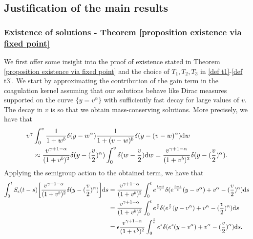 \documentclass[11pt]{article}
\numberwithin{equation}{section}
\newcommand{\der}{\textup{d}}
\begin{document}

\subsection{Justification of the main results}\label{proof of existence heuristics}
\subsubsection*{Existence of solutions - Theorem \ref{proposition existence via fixed point}}
We first offer some insight into the proof of existence stated in Theorem \ref{proposition existence via fixed point} and the choice of $T_{1},T_{2}, T_{3}$ in \eqref{def t1}-\eqref{def t3}. We start by approximating the contribution of the gain term in the coagulation kernel assuming that our solutions behave like Dirac measures supported on the curve $\{y=v^{\alpha}\}$ with sufficiently fast decay for large values of $v$. The decay in $v$ is so that we obtain mass-conserving solutions. More precisely, we have that
\begin{align*}
    v^{\gamma}&\int_{0}^{v}\frac{1}{1+w^{b}}\delta(y-w^{\alpha})\frac{1}{1+(v-w)^{b}}\delta(y-(v-w)^{\alpha})\der w\\
    &\approx \frac{v^{\gamma+1-\alpha}}{(1+v^{b})^{2}}\delta(y-(\frac{v}{2})^{\alpha})\int_{0}^{v}\delta(w-\frac{v}{2})\der w=\frac{v^{\gamma+1-\alpha}}{(1+v^{b})^{2}}\delta(y-(\frac{v}{2})^{\alpha}).
\end{align*}
Applying the semigroup action to the obtained term, we have that
\begin{align*}
    \int_{0}^{t}S_{\epsilon}(t-s)\bigg[\frac{v^{\gamma+1-\alpha}}{(1+v^{b})^{2}}\delta(y-(\frac{v}{2})^{\alpha})\bigg]\der s&= \frac{v^{\gamma+1-\alpha}}{(1+v^{b})^{2}}\int_{0}^{t}e^{\frac{t-s}{\epsilon}}\delta(e^{\frac{t-s}{\epsilon}}(y-v^{\alpha})+v^{\alpha}-(\frac{v}{2})^{\alpha})\der s\\
    &= \frac{v^{\gamma+1-\alpha}}{(1+v^{b})^{2}}\int_{0}^{t}e^{\frac{s}{\epsilon}}\delta(e^{\frac{s}{\epsilon}}(y-v^{\alpha})+v^{\alpha}-(\frac{v}{2})^{\alpha})\der s\\
       &= \epsilon \frac{v^{\gamma+1-\alpha}}{(1+v^{b})^{2}}\int_{0}^{\frac{t}{\epsilon}}e^{s}\delta(e^{s}(y-v^{\alpha})+v^{\alpha}-(\frac{v}{2})^{\alpha})\der s.
\end{align*}
\end{document}
